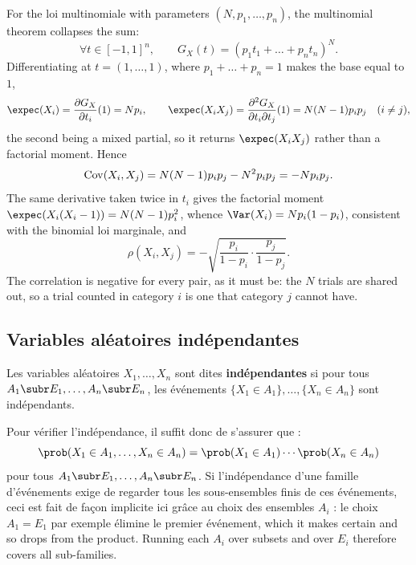 \begin{example}
  For the loi multinomiale with parameters $(N, p_{1}, \dots, p_{n})$, the
  multinomial theorem collapses the sum:
  \[ \forall t \in [-1,1]^{n}, \qquad
     G_{X}(t) = (p_{1}t_{1} + \dots + p_{n}t_{n})^{N}. \]
  Differentiating at $t = (1, \dots, 1)$, where $p_{1} + \dots + p_{n} = 1$
  makes the base equal to $1$,
  \[ \expec(X_{i}) = \frac{\partial G_{X}}{\partial t_{i}}(1) = N p_{i},
     \qquad
     \expec(X_{i}X_{j})
       = \frac{\partial^{2} G_{X}}{\partial t_{i} \partial t_{j}}(1)
       = N(N-1) p_{i}p_{j} \quad (i \ne j), \]
  the second being a mixed partial, so it returns $\expec(X_{i}X_{j})$ rather
  than a factorial moment. Hence
  \[ \operatorname{Cov}(X_{i}, X_{j}) = N(N-1)p_{i}p_{j} - N^{2}p_{i}p_{j} = -N p_{i}p_{j}. \]
  The same derivative taken twice in $t_{i}$ gives the factorial moment
  $\expec(X_{i}(X_{i}-1)) = N(N-1)p_{i}^{2}$, whence
  $\Var(X_{i}) = Np_{i}(1-p_{i})$, consistent with the binomial loi marginale,
  and
  \[ \rho(X_{i}, X_{j})
       = -\sqrt{\frac{p_{i}}{1-p_{i}} \cdot \frac{p_{j}}{1-p_{j}}}. \]
  The correlation is negative for every pair, as it must be: the $N$ trials are
  shared out, so a trial counted in category $i$ is one that category $j$ cannot
  have.
\end{example}

\subsection{Variables aléatoires indépendantes}

\begin{definition}
  Les variables aléatoires $X_{1}, \dots, X_{n}$ sont dites
  \textbf{indépendantes} si pour tous $A_{1} \subr E_{1}, \dots, A_{n} \subr E_{n}$,
  les événements $\{X_{1} \in A_{1}\}, \dots, \{X_{n} \in A_{n}\}$ sont
  indépendants.
\end{definition}

Pour vérifier l'indépendance, il suffit donc de s'assurer que :
\[ \prob(X_{1} \in A_{1}, \dots, X_{n} \in A_{n})
     = \prob(X_{1} \in A_{1}) \cdots \prob(X_{n} \in A_{n}) \]
pour tous $A_{1} \subr E_{1}, \dots, A_{n} \subr E_{n}$. Si l'indépendance d'une
famille d'événements exige de regarder tous les sous-ensembles finis de ces
événements, ceci est fait de façon implicite ici grâce au choix des ensembles
$A_{i}$ : le choix $A_{1} = E_{1}$ par exemple élimine le premier événement,
which it makes certain and so drops from the product. Running each $A_{i}$ over
subsets and over $E_{i}$ therefore covers all sub-families.

